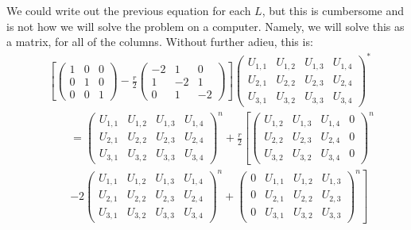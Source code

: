 \documentclass[11pt]{article}
\def\f{\frac }
\begin{document}
\begin{enumerate}
We could write out the previous equation for each $L$, but this is cumbersome and is not how we will solve the problem on a computer.
Namely, we will solve this as a matrix, for all of the columns.
Without further adieu, this is:
\begin{align*} & \left [ \left ( \begin{array}{ccc} 1 & 0 & 0\\ 0 & 1 & 0\\ 0 & 0 & 1 \end{array} \right )  - \f{r}{2} \left ( \begin{array}{ccc} -2 & 1 & 0\\ 1 & -2 & 1\\ 0 & 1 & -2 \end{array} \right )\right ] \left ( \begin{array}{cccc} U_{1,1} & U_{1,2} & U_{1,3} & U_{1,4 }\\ U_{2,1} & U_{2,2} & U_{2,3} & U_{2,4 } \\ U_{3,1} & U_{3,2} & U_{3,3} & U_{3,4 }  \end{array} \right ) ^{*} \\
& ~~~~~~~~~= \left ( \begin{array}{cccc} U_{1,1} & U_{1,2} & U_{1,3} & U_{1,4 }\\ U_{2,1} & U_{2,2} & U_{2,3} & U_{2,4 } \\ U_{3,1} & U_{3,2} & U_{3,3} & U_{3,4 }  \end{array} \right ) ^{n} + \f{r}{2} \left [ \left ( \begin{array}{cccc} U_{1,2} & U_{1,3} & U_{1,4} & 0 \\ U_{2,2} & U_{2,3} & U_{2,4} & 0 \\ U_{3,2} & U_{3,2} & U_{3,4} & 0  \end{array} \right ) ^{n} \right.\\
& ~~~~~~~~~\left. -2\left ( \begin{array}{cccc} U_{1,1} & U_{1,2} & U_{1,3} & U_{1,4 }\\ U_{2,1} & U_{2,2} & U_{2,3} & U_{2,4 } \\ U_{3,1} & U_{3,2} & U_{3,3} & U_{3,4 }  \end{array} \right ) ^{n} + \left ( \begin{array}{cccc} 0 & U_{1,1} & U_{1,2} & U_{1,3 }\\ 0 & U_{2,1} & U_{2,2} & U_{2,3 } \\ 0 & U_{3,1} & U_{3,2} & U_{3,3 }  \end{array} \right ) ^{n} \right ]\end{align*}


\end{enumerate}
\end{document}
